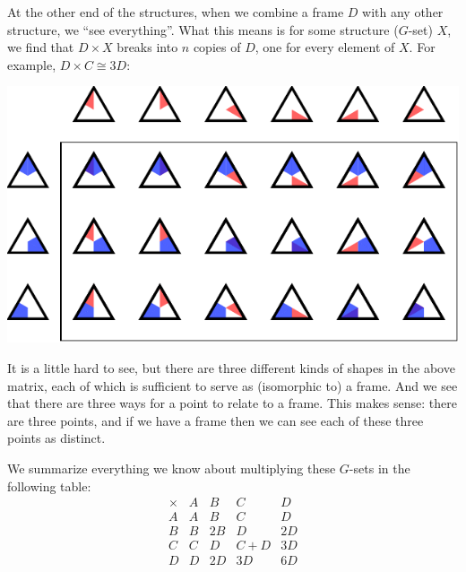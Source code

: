 \documentclass[11pt,oneside]{article}
\newcommand{\thinplus}{\!+\!}
\begin{document}
At the other end of the structures, 
when we combine a frame $D$ with any other structure,
we ``see everything''.
What this means is 
for some structure ($G$-set) $X$, we find that $D\times X$
breaks into $n$ copies of $D$, one for every element of $X$.
For example, $D\times C\cong 3D:$
\begin{center}
\includegraphics[]{pic-triangle-point-frame-matrix.pdf} 
\end{center}
It is a little hard to see, but there are three different
kinds of shapes in the above matrix, 
each of which is sufficient to serve as (isomorphic to) a frame.
And we see that there are three ways for a point to relate to
a frame. This makes sense: there are three points, and if we
have a frame then we can see each of these three points as distinct.

We summarize everything we know about 
multiplying these $G$-sets in the following table:
$$
\begin{array}{r|rrrr}
\times & A & B & C & D \\
\hline
A & A & B & C & D \\
B & B & 2B & D & 2D \\
C & C & D & C\thinplus D & 3D \\
D & D & 2D & 3D & 6D \\
\end{array}
$$
\end{document}
